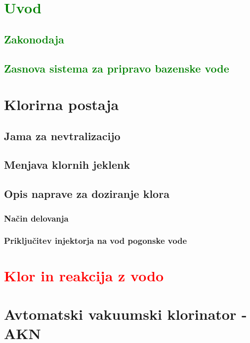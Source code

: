 \documentclass[11pt,fleqn]{book}
\begin{document}
	

	
\chapter{\textcolor{green}{Uvod}}
\section{\textcolor{green}{Zakonodaja}}
\section{\textcolor{green}{Zasnova sistema za pripravo bazenske vode}}

\chapter{Klorirna postaja}
\section{Jama za nevtralizacijo}
\section{Menjava klornih jeklenk}
\section{Opis naprave za doziranje klora} %
\subsection{Način delovanja}
\subsection{Priključitev injektorja na vod pogonske vode}

\chapter{\textcolor{red}{Klor in reakcija z vodo}} %

\chapter{Avtomatski vakuumski klorinator - AKN}%
\end{document}
